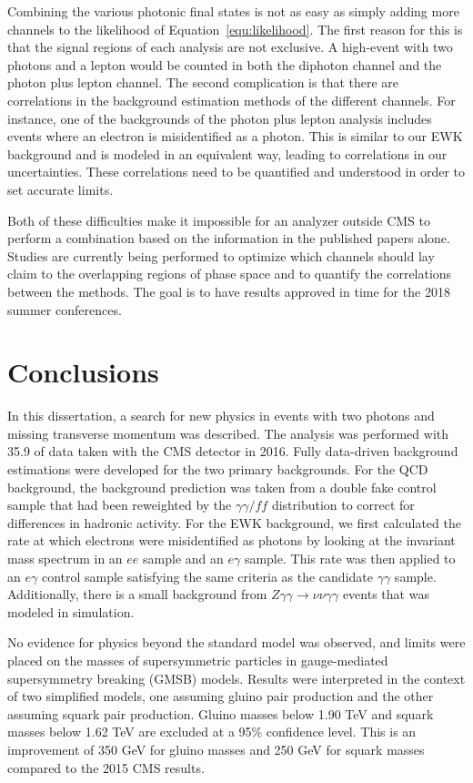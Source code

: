 Combining the various photonic final states is not as easy as simply adding more 
channels to the likelihood of Equation~\ref{equ:likelihood}. The first reason for this is
that the signal regions of each analysis are not exclusive. A high-\ETmiss event with two photons 
and a lepton would be counted in both the diphoton channel and the photon plus lepton channel.
The second complication is that there are correlations
in the background estimation methods of the different channels.
For instance, one of the backgrounds of the 
photon plus lepton analysis includes events where an electron is misidentified as a photon.
This is similar to our EWK background and is modeled in an equivalent way, leading to 
correlations in our uncertainties. These correlations need to be quantified and understood 
in order to set accurate limits.

Both of these difficulties 
make it impossible for an analyzer outside CMS to perform a combination based on the information 
in the published papers alone.
Studies are currently being performed to optimize which channels should
lay claim to the overlapping regions of phase space 
and to quantify the correlations between the methods. The goal is to have
results approved in time for the 2018 summer conferences.

\section{Conclusions}
\label{sec:conclusions}
In this dissertation, a search for new physics in events with two photons and missing transverse momentum was described. The analysis was performed with 35.9 \fbinv of data taken with the CMS detector in 2016. Fully data-driven background estimations were developed for the two primary backgrounds. For the QCD background, the background prediction was taken from a double fake control sample that had been reweighted by the $\gamma\gamma/ff$ \diempt distribution to correct for differences in hadronic activity. For the EWK background, we first calculated the rate at which electrons were misidentified as photons by looking at the invariant mass spectrum in an $ee$ sample and an $e\gamma$ sample. This rate was then applied to an $e\gamma$ control sample satisfying the same criteria as the candidate $\gamma\gamma$ sample. Additionally, there is a small background from $Z\gamma\gamma\rightarrow\nu\nu\gamma\gamma$ events that was modeled in simulation. 

No evidence for physics beyond the standard model was observed, and limits were placed on the masses of supersymmetric particles
in gauge-mediated supersymmetry breaking (GMSB) models. Results were interpreted in the context of two simplified models, one assuming gluino pair production and the other assuming squark pair production. Gluino masses below 1.90 TeV and squark masses below 1.62 TeV are excluded at a 95\% confidence level. This is an improvement of 350 GeV for gluino masses and 250 GeV for squark masses compared to the 2015 CMS results.